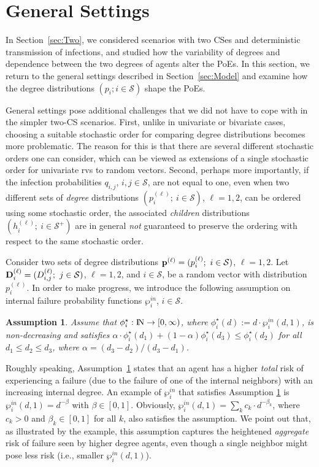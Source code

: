 \documentclass[10pt, journal, compsoc]{IEEEtran}
\newcommand {\cS}{{\mathcal{S}}}
\newcommand {\bp} {{\bf p}}
\newcommand {\N} {{\rm I\kern-1.5pt N}}
\newtheorem{assm}{Assumption}%
\begin{document}
\section{General Settings}
	\label{sec:General}

In Section~\ref{sec:Two}, we considered scenarios 
with two CSes and deterministic transmission 
of infections, and studied how the variability 
of degrees and dependence
between the two degrees of agents alter the
PoEs. In this section, we 
return to the general settings described
in Section~\ref{sec:Model} and examine 
how the degree distributions $(p_i; i \in 
\cS)$ shape the PoEs.

General settings pose additional challenges that 
we did not have to cope with in the simpler
two-CS scenarios. First, unlike in univariate
or bivariate cases, choosing a suitable stochastic 
order for comparing degree distributions becomes 
more problematic. The reason for this is that 
there are several different stochastic orders one 
can consider, which can be
viewed as extensions of a single
stochastic order for univariate rvs to
random vectors.
Second, perhaps more importantly, 
if the infection probabilities
$q_{i,j}$, $i, j \in \cS$, 
are not equal to one, even when two 
different sets of {\em degree} distributions 
$(p^{(\ell)}_i; \ i \in \cS)$, $\ell
= 1, 2$, can be ordered using some 
stochastic order, the associated {\em children}
distributions $(h^{(\ell)}_i; \ i \in 
\cS^+)$ are in general {\em not} guaranteed 
to preserve the ordering with respect to 
the same stochastic order. 

Consider two sets of degree distributions $\bp^{(\ell)} 
= (p^{(\ell)}_i; \ i \in \cS)$, $\ell = 1, 
2$. Let ${\bf D}^{(\ell)}_i = (D^{(\ell)}_{i,j}; \ 
j \in \cS)$, $\ell = 1, 2$, and $i \in \cS$,
be a random vector with distribution $p^{(\ell)}_i$. 
In order to make progress, we introduce the 
following assumption on internal failure 
probability functions $\wp^{in}_i$, 
$i \in \cS$. 

\begin{assm}	\label{assm:phi}
Assume that $\phi_i^\star: \N \to [0, \infty)$, 
where $\phi_i^\star(d) := d \cdot 
\wp^{in}_i(d, 1)$,  
is non-decreasing and satisfies
$\alpha \cdot	
\phi^\star_i(d_1) + (1 - \alpha)
\phi^\star_i(d_3)
\leq \phi^\star_i(d_2)$ for all $d_1
\leq d_2 \leq d_3$, where $\alpha
= (d_3 - d_2) / (d_3 - d_1)$.
\end{assm}

Roughly speaking, 
Assumption~\ref{assm:phi} states that an agent
has a higher {\em total} risk of experiencing a 
failure (due to the failure of one of the internal 
neighbors) with an increasing internal degree. 
An example of $\wp^{in}_i$ that satisfies Assumption
\ref{assm:phi} is $\wp^{in}_i(d, 1) = d^{-\beta}$ 
with $\beta \in [0, 1]$. Obviously, $\wp^{in}_i(d, 1) 
= \sum_{k} c_k \cdot d^{-\beta_k}$, where
$c_k > 0$ and $\beta_k \in [0, 1]$ for all $k$, 
also satisfies the assumption. We point out
that, as illustrated by the example, 
this assumption captures the heightened 
{\em aggregate} risk of failure seen by higher
degree agents, even though a single neighbor
might pose less risk (i.e., smaller 
$\wp^{in}_i(d, 1)$). 
\end{document}
